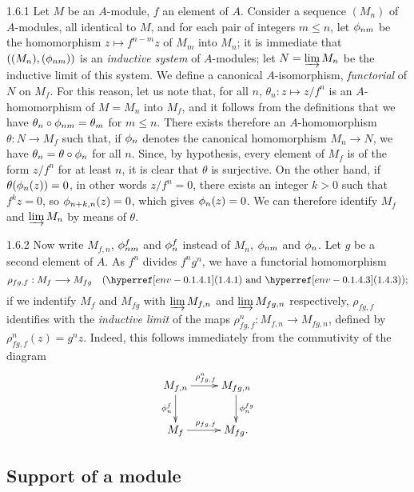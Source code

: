 \documentclass[10pt,oneside]{book}
\begin{document}
\begin{env}{1.6.1}
\label{env-0.1.6.1}
Let $M$ be an $A$-module, $f$ an element of $A$. Consider a sequence $(M_n)$ of $A$-modules,
all identical to $M$, and for each pair of integers $m\leqslant n$, let $\phi_{nm}$ be the
homomorphism $z\mapsto f^{n-m}z$ of $M_m$ into $M_n$; it is immediate that
$((M_n),(\phi_{nm}))$ is an \emph{inductive system} of $A$-modules; let $N=\varinjlim M_n$
be the inductive limit of this system. We define a canonical $A$-isomorphism,
\emph{functorial} of $N$ on $M_f$. For this reason, let us note that, for all $n$,
$\theta_n:z\mapsto z/f^n$ is an $A$-homomorphism of $M=M_n$ into $M_f$, and it follows from
the definitions that we have $\theta_n\circ\phi_{nm}=\theta_m$ for $m\leqslant n$. There
exists therefore an $A$-homomorphism $\theta:N\to M_f$ such that, if $\phi_n$ denotes the
canonical homomorphism $M_n\to N$, we have $\theta_n=\theta\circ\phi_n$ for all $n$. Since,
by hypothesis, every element of $M_f$ is of the form $z/f^n$ for at least $n$, it is clear
that $\theta$ is surjective. On the other hand, if $\theta(\phi_n(z))=0$, in other words
$z/f^n=0$, there exists an integer $k>0$ such that $f^k z=0$, so $\phi_{n+k,n}(z)=0$, which
gives $\phi_n(z)=0$. We can therefore identify $M_f$ and $\varinjlim M_n$ by means of
$\theta$.
\end{env}

\begin{env}{1.6.2}
\label{env-0.1.6.2}
Now write $M_{f,n}$, $\phi_{nm}^f$ and $\phi_n^f$ instead of $M_n$, $\phi_{nm}$ and
$\phi_n$. Let $g$ be a second element of $A$. As $f^n$ divides $f^n g^n$, we have a
functorial homomorphism
\[
  \rho_{fg,f}:M_f\longrightarrow M_{fg}\quad(\sref{env}{1.4.1}\text{ and }\sref{env}{1.4.3});
\]
if we indentify $M_f$ and $M_{fg}$ with $\varinjlim M_{f,n}$ and $\varinjlim M_{fg,n}$
respectively, $\rho_{fg,f}$ identifies with the \emph{inductive limit} of the maps
$\rho_{fg,f}^n:M_{f,n}\to M_{fg,n}$, defined by $\rho_{fg,f}^n(z)=g^n z$. Indeed, this
follows immediately from the commutivity of the diagram
\[
  \xymatrix{
    M_{f,n}\ar[r]^{\rho_{fg,f}^n}\ar[d]_{\vphi_n^f} & M_{fg,n}\ar[d]^{\vphi_n^{fg}}\\
    M_f\ar[r]^{\rho_{fg,f}} & M_{fg}.
  }
\]
\end{env}

\subsection{Support of a module}
\label{0-prelim-1.7}
\end{document}
